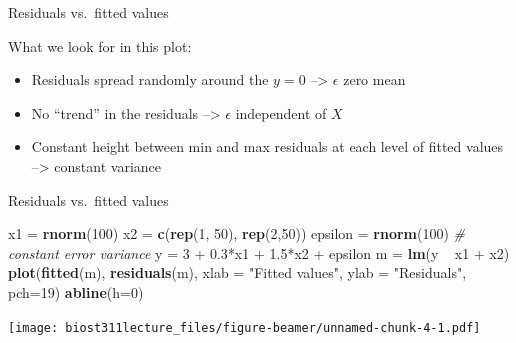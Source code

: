 \documentclass[12pt,ignorenonframetext,]{beamer}
\newenvironment{Shaded}{\begin{snugshade}}{\end{snugshade}}
\newcommand{\KeywordTok}[1]{\textcolor[rgb]{0.13,0.29,0.53}{\textbf{{#1}}}}
\newcommand{\DataTypeTok}[1]{\textcolor[rgb]{0.13,0.29,0.53}{{#1}}}
\newcommand{\DecValTok}[1]{\textcolor[rgb]{0.00,0.00,0.81}{{#1}}}
\newcommand{\FloatTok}[1]{\textcolor[rgb]{0.00,0.00,0.81}{{#1}}}
\newcommand{\StringTok}[1]{\textcolor[rgb]{0.31,0.60,0.02}{{#1}}}
\newcommand{\CommentTok}[1]{\textcolor[rgb]{0.56,0.35,0.01}{\textit{{#1}}}}
\newcommand{\NormalTok}[1]{{#1}}
\providecommand{\tightlist}{%
\setlength{\itemsep}{0pt}\setlength{\parskip}{0pt}}
\begin{document}
\begin{frame}{Residuals vs.~fitted values}

What we look for in this plot:

\begin{itemize}
\tightlist
\item
  Residuals spread randomly around the \(y = 0\) --\textgreater{}
  \(\epsilon\) zero mean
\item
  No ``trend'' in the residuals --\textgreater{} \(\epsilon\)
  independent of \(X\)
\item
  Constant height between min and max residuals at each level of fitted
  values --\textgreater{} constant variance
\end{itemize}

\end{frame}

\begin{frame}[fragile]{Residuals vs.~fitted values}

\tiny

\begin{Shaded}
\begin{Highlighting}[]
\NormalTok{x1 =}\StringTok{ }\KeywordTok{rnorm}\NormalTok{(}\DecValTok{100}\NormalTok{)}
\NormalTok{x2 =}\StringTok{ }\KeywordTok{c}\NormalTok{(}\KeywordTok{rep}\NormalTok{(}\DecValTok{1}\NormalTok{, }\DecValTok{50}\NormalTok{), }\KeywordTok{rep}\NormalTok{(}\DecValTok{2}\NormalTok{,}\DecValTok{50}\NormalTok{))}
\NormalTok{epsilon =}\StringTok{ }\KeywordTok{rnorm}\NormalTok{(}\DecValTok{100}\NormalTok{) }\CommentTok{# constant error variance}
\NormalTok{y =}\StringTok{ }\DecValTok{3} \NormalTok{+}\StringTok{ }\FloatTok{0.3}\NormalTok{*x1 +}\StringTok{ }\FloatTok{1.5}\NormalTok{*x2 +}\StringTok{ }\NormalTok{epsilon}
\NormalTok{m =}\StringTok{ }\KeywordTok{lm}\NormalTok{(y ~}\StringTok{ }\NormalTok{x1 +}\StringTok{ }\NormalTok{x2)}
\KeywordTok{plot}\NormalTok{(}\KeywordTok{fitted}\NormalTok{(m), }\KeywordTok{residuals}\NormalTok{(m), }\DataTypeTok{xlab =} \StringTok{"Fitted values"}\NormalTok{, }\DataTypeTok{ylab =} \StringTok{"Residuals"}\NormalTok{, }\DataTypeTok{pch=}\DecValTok{19}\NormalTok{)}
\KeywordTok{abline}\NormalTok{(}\DataTypeTok{h=}\DecValTok{0}\NormalTok{)}
\end{Highlighting}
\end{Shaded}

\texttt{[image: biost311lecture\_files/figure-beamer/unnamed-chunk-4-1.pdf]}

\normalsize

\end{frame}
\end{document}

